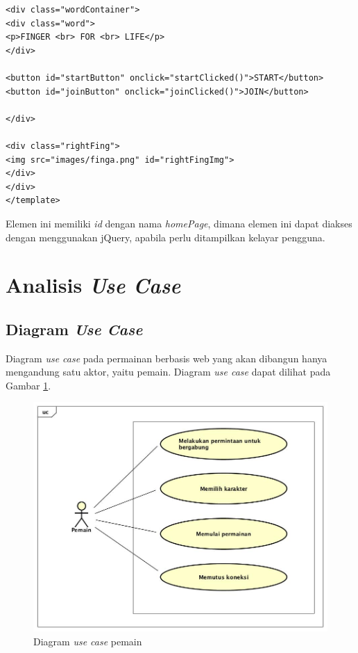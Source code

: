 \begin{enumerate}
\begin{lstlisting}
<div class="wordContainer">
<div class="word">
<p>FINGER <br> FOR <br> LIFE</p>
</div>
	
<button id="startButton" onclick="startClicked()">START</button>
<button id="joinButton" onclick="joinClicked()">JOIN</button>
	
</div>
	
<div class="rightFing">
<img src="images/finga.png" id="rightFingImg">
</div>
</div>
</template>
\end{lstlisting}
Elemen ini memiliki \textit{id} dengan nama \textit{homePage}, dimana elemen ini dapat diakses dengan menggunakan jQuery, apabila perlu ditampilkan kelayar pengguna.

\end{enumerate}

\section{Analisis \textit{Use Case}}

\subsection{Diagram \textit{Use Case}}
\label{usecase}

Diagram \textit{use case} pada permainan berbasis web yang akan dibangun hanya mengandung satu aktor, yaitu pemain. Diagram \textit{use case} dapat dilihat pada Gambar \ref{fig:usecase_pemain}.

\begin{figure}[H]
	\centering
	\includegraphics[scale=0.4]{Gambar/usecase_pemain}
	\caption{Diagram \textit{use case} pemain}
	\label{fig:usecase_pemain}
\end{figure}

